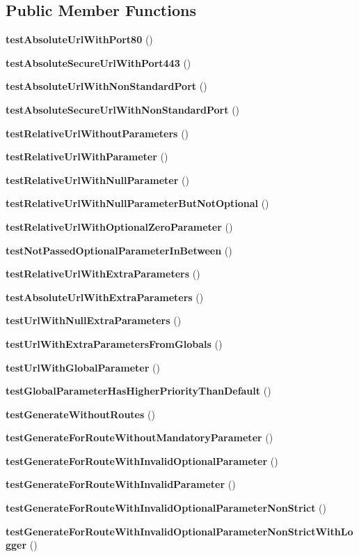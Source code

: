 \subsection*{Public Member Functions}
\begin{DoxyCompactItemize}
\item 
{\bf test\+Absolute\+Url\+With\+Port80} ()
\item 
{\bf test\+Absolute\+Secure\+Url\+With\+Port443} ()
\item 
{\bf test\+Absolute\+Url\+With\+Non\+Standard\+Port} ()
\item 
{\bf test\+Absolute\+Secure\+Url\+With\+Non\+Standard\+Port} ()
\item 
{\bf test\+Relative\+Url\+Without\+Parameters} ()
\item 
{\bf test\+Relative\+Url\+With\+Parameter} ()
\item 
{\bf test\+Relative\+Url\+With\+Null\+Parameter} ()
\item 
{\bf test\+Relative\+Url\+With\+Null\+Parameter\+But\+Not\+Optional} ()
\item 
{\bf test\+Relative\+Url\+With\+Optional\+Zero\+Parameter} ()
\item 
{\bf test\+Not\+Passed\+Optional\+Parameter\+In\+Between} ()
\item 
{\bf test\+Relative\+Url\+With\+Extra\+Parameters} ()
\item 
{\bf test\+Absolute\+Url\+With\+Extra\+Parameters} ()
\item 
{\bf test\+Url\+With\+Null\+Extra\+Parameters} ()
\item 
{\bf test\+Url\+With\+Extra\+Parameters\+From\+Globals} ()
\item 
{\bf test\+Url\+With\+Global\+Parameter} ()
\item 
{\bf test\+Global\+Parameter\+Has\+Higher\+Priority\+Than\+Default} ()
\item 
{\bf test\+Generate\+Without\+Routes} ()
\item 
{\bf test\+Generate\+For\+Route\+Without\+Mandatory\+Parameter} ()
\item 
{\bf test\+Generate\+For\+Route\+With\+Invalid\+Optional\+Parameter} ()
\item 
{\bf test\+Generate\+For\+Route\+With\+Invalid\+Parameter} ()
\item 
{\bf test\+Generate\+For\+Route\+With\+Invalid\+Optional\+Parameter\+Non\+Strict} ()
\item 
{\bf test\+Generate\+For\+Route\+With\+Invalid\+Optional\+Parameter\+Non\+Strict\+With\+Logger} ()

\end{DoxyCompactItemize}
